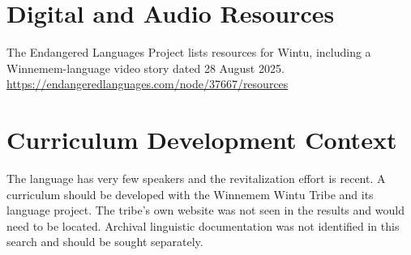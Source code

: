 \documentclass[12pt]{article}
\begin{document}
\section{Digital and Audio Resources}
The Endangered Languages Project lists resources for Wintu, including a Winnemem-language video story dated 28 August 2025. \url{https://endangeredlanguages.com/node/37667/resources}

\section{Curriculum Development Context}
The language has very few speakers and the revitalization effort is recent. A curriculum should be developed with the Winnemem Wintu Tribe and its language project. The tribe's own website was not seen in the results and would need to be located. Archival linguistic documentation was not identified in this search and should be sought separately.
\end{document}
